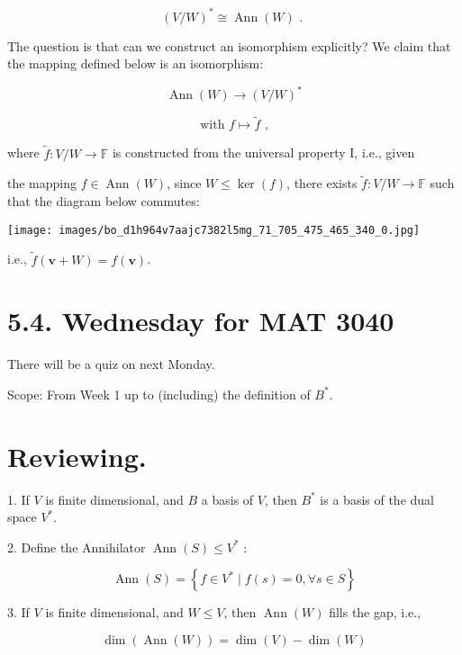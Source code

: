 \documentclass[11pt]{article}
\begin{document}
\[
{\left( V/W\right) }^{ * } \cong  \operatorname{Ann}\left( W\right) \text{ . }
\]

The question is that can we construct an isomorphism explicitly? We claim that the mapping defined below is an isomorphism:

\[
\operatorname{Ann}\left( W\right)  \rightarrow  {\left( V/W\right) }^{ * }
\]

\[
\text{ with }f \mapsto  \widetilde{f}\text{ , }
\]

where \(\widetilde{f} : V/W \rightarrow  \mathbb{F}\) is constructed from the universal property I, i.e., given

the mapping \(f \in  \operatorname{Ann}\left( W\right)\), since \(W \leq  \ker \left( f\right)\), there exists \(\widetilde{f} : V/W \rightarrow  \mathbb{F}\) such that the diagram below commutes:

\begin{center}
\texttt{[image: images/bo\_d1h964v7aajc7382l5mg\_71\_705\_475\_465\_340\_0.jpg]}
\end{center}
\hspace*{3em} 

i.e., \(\widetilde{f}\left( {\mathbf{v} + W}\right)  = f\left( \mathbf{v}\right)\).

\section*{5.4. Wednesday for MAT 3040}

There will be a quiz on next Monday.

Scope: From Week 1 up to (including) the definition of \({B}^{ * }\).

\section*{Reviewing.}

1. If \(V\) is finite dimensional, and \(B\) a basis of \(V\), then \({B}^{ * }\) is a basis of the dual space \({V}^{ * }\).

2. Define the Annihilator \(\operatorname{Ann}\left( S\right)  \leq  {V}^{ * }\) :

\[
\operatorname{Ann}\left( S\right)  = \left\{  {f \in  {V}^{ * } \mid  f\left( s\right)  = 0,\forall s \in  S}\right\}
\]

3. If \(V\) is finite dimensional, and \(W \leq  V\), then \(\operatorname{Ann}\left( W\right)\) fills the gap, i.e.,

\[
\dim \left( {\operatorname{Ann}\left( W\right) }\right)  = \dim \left( V\right)  - \dim \left( W\right)
\]
\end{document}
